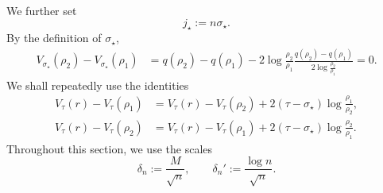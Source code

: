\documentclass[a4paper]{article}
\numberwithin{equation}{section}
\begin{document}
We further set
\begin{equation}
\label{def of index jstar}
    j_{\star}:=n\sigma_{\star}.
\end{equation}
By the definition of $\sigma_{\star}$,
\begin{align*}
V_{\sigma_{\star}}(\rho_{2})-V_{\sigma_{\star}}(\rho_{1})
&=q(\rho_{2})-q(\rho_{1})-2\log\frac{\rho_{2}}{\rho_{1}}\frac{q(\rho_{2})-q(\rho_{1})}{2\log\frac{\rho_{2}}{\rho_{1}}}=0.
\end{align*}
We shall repeatedly use the identities
\begin{align}
\label{def of difference between Vtau V rho1 jstar}
V_{\tau}(r)-V_{\tau}(\rho_{1})
&=V_{\tau}(r)-V_{\tau}(\rho_{2})+2(\tau-\sigma_{\star})\log\frac{\rho_{1}}{\rho_{2}}, 
\\
\label{def of difference between Vtau V rho2 jstar}
V_{\tau}(r)-V_{\tau}(\rho_{2})&=
V_{\tau}(r)-V_{\tau}(\rho_{1})+2(\tau-\sigma_{\star})\log\frac{\rho_{2}}{\rho_{1}}. 
\end{align}
Throughout this section, we use the scales
\begin{equation}
\delta_n:=\frac{M}{\sqrt{n}},\qquad \delta_n':=\frac{\log n}{\sqrt{n}}.  
\end{equation}
\end{document}
